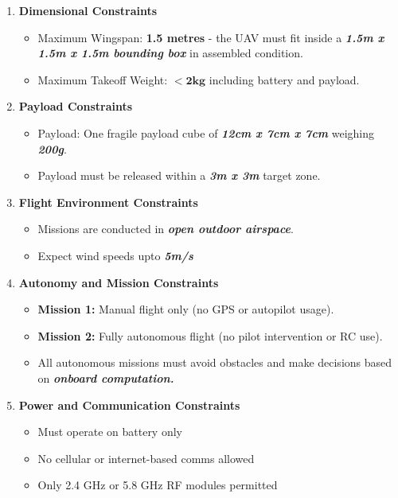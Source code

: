 \documentclass[12pt]{report}
\begin{document}
    \begin{enumerate}
      \item \textbf{Dimensional Constraints}
        \begin{itemize}
          \item Maximum Wingspan: \textbf{1.5 metres} - the UAV must fit inside a \textbf{\textit{1.5m x 1.5m x 1.5m bounding box}} in assembled condition.
          \item Maximum Takeoff Weight: $ \boldsymbol{< 2kg} $ including battery and payload.
        \end{itemize}
      \item \textbf{Payload Constraints}
        \begin{itemize}
          \item Payload: One fragile payload cube of \textbf{\textit{12cm x 7cm x 7cm}} weighing \textbf{\textit{200g}}.
          \item Payload must be released within a \textbf{\textit{3m x 3m}} target zone.
        \end{itemize}
      \item \textbf{Flight Environment Constraints}
        \begin{itemize}
          \item Missions are conducted in \textbf{\textit{open outdoor airspace}}.
          \item Expect wind speeds upto \textbf{\textit{5m/s}}
        \end{itemize}
      \item \textbf{Autonomy and Mission Constraints}
        \begin{itemize}
          \item \textbf{Mission 1:} Manual flight only (no GPS or autopilot usage).
          \item \textbf{Mission 2:} Fully autonomous flight (no pilot intervention or RC use).
          \item All autonomous missions must avoid obstacles and make decisions based on \textbf{\textit{onboard computation.}}
        \end{itemize}
      \item \textbf{Power and Communication Constraints}
        \begin{itemize}
          \item Must operate on battery only
          \item No cellular or internet-based comms allowed
          \item Only 2.4 GHz or 5.8 GHz RF modules permitted

\end{itemize}
\end{enumerate}
\end{document}
